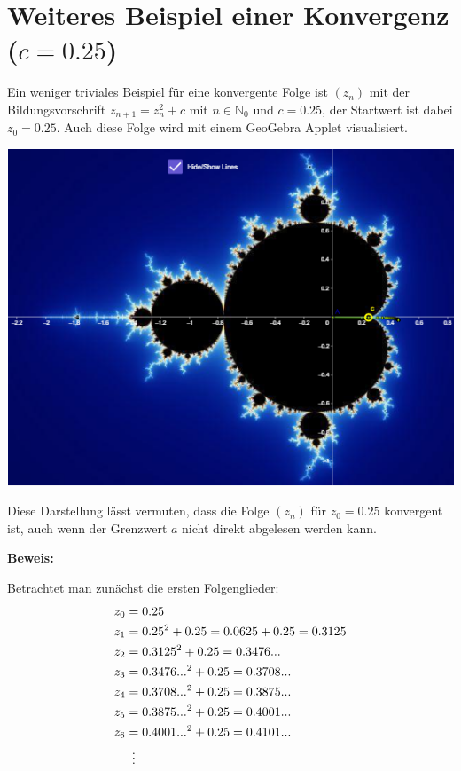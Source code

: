 \documentclass[a4paper, 12pt]{book}
\begin{document}
\section{Weiteres Beispiel einer Konvergenz ($c=0.25$)}

Ein weniger triviales Beispiel für eine konvergente Folge ist
\(\left( z_{n} \right)\) mit der Bildungsvorschrift
\(z_{n + 1} = z_{n}^{2} + c\) mit \(n \in \mathbb{N}_{0}\) und
\(c = 0.25\), der Startwert ist dabei \(z_{0} = 0.25\). Auch
diese Folge wird mit einem GeoGebra Applet visualisiert.

\begin{center}
\includegraphics[width=0.5\linewidth]{image11.png}
\end{center}


Diese Darstellung lässt vermuten, dass die Folge
\(\left( z_{n} \right)\) für \(z_{0} = 0.25\) konvergent ist, auch
wenn der Grenzwert \(a\) nicht direkt abgelesen werden kann.

\textbf{Beweis:}

Betrachtet man zunächst die ersten Folgenglieder:
\begin{align*}
z_{0} &= 0.25\\
z_{1} &= {0.25}^{2} + 0.25 = 0.0625 + 0.25 = 0.3125\\
z_{2} &= {0.3125}^{2} + 0.25 = 0.3476...\\
z_{3} &= {0.3476...}^{2} + 0.25 = 0.3708...\\
z_{4} &= {0.3708...}^{2} + 0.25 = 0.3875...\\
z_{5} &= {0.3875...}^{2} + 0.25 = 0.4001...\\
z_{6} &= {0.4001...}^{2} + 0.25 = 0.4101...\\
      &\vdotswithin{=} %
\end{align*}
\end{document}
